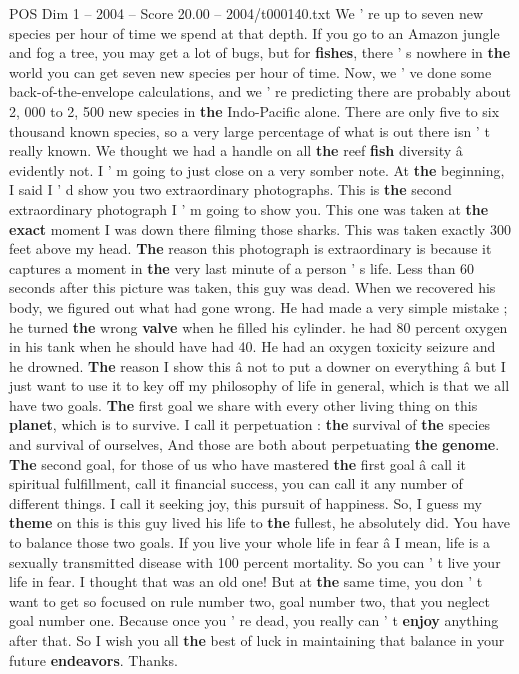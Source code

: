 \begin{textsample}{POS Dim 1 – 2004 – Score 20.00 – 2004/t000140.txt}
We ' re up to seven new species per hour of time we spend at that depth.
If you go to an Amazon jungle and fog a tree, you may get a lot of bugs, but for \textbf{fishes}, there ' s nowhere in \textbf{the} world you can get seven new species per hour of time.
Now, we ' ve done some back-of-the-envelope calculations, and we ' re predicting there are probably about 2, 000 to 2, 500 new species in \textbf{the} Indo-Pacific alone.
There are only five to six thousand known species, so a very large percentage of what is out there isn ' t really known.
We thought we had a handle on all \textbf{the} reef \textbf{fish} diversity â evidently not.
I ' m going to just close on a very somber note.
At \textbf{the} beginning, I said I ' d show you two extraordinary photographs.
This is \textbf{the} second extraordinary photograph I ' m going to show you.
This one was taken at \textbf{the} \textbf{exact} moment I was down there filming those sharks.
This was taken exactly 300 feet above my head. \textbf{The} reason this photograph is extraordinary is because it captures a moment in \textbf{the} very last minute of a person ' s life.
Less than 60 seconds after this picture was taken, this guy was dead.
When we recovered his body, we figured out what had gone wrong.
He had made a very simple mistake ; he turned \textbf{the} wrong \textbf{valve} when he filled his cylinder. he had 80 percent oxygen in his tank when he should have had 40.
He had an oxygen toxicity seizure and he drowned. \textbf{The} reason I show this â not to put a downer on everything â but I just want to use it to key off my philosophy of life in general, which is that we all have two goals. \textbf{The} first goal we share with every other living thing on this \textbf{planet}, which is to survive.
I call it perpetuation : \textbf{the} survival of \textbf{the} species and survival of ourselves, And those are both about perpetuating \textbf{the} \textbf{genome}. \textbf{The} second goal, for those of us who have mastered \textbf{the} first goal â call it spiritual fulfillment, call it financial success, you can call it any number of different things.
I call it seeking joy, this pursuit of happiness.
So, I guess my \textbf{theme} on this is this guy lived his life to \textbf{the} fullest, he absolutely did.
You have to balance those two goals.
If you live your whole life in fear â I mean, life is a sexually transmitted disease with 100 percent mortality.
So you can ' t live your life in fear.
I thought that was an old one!
But at \textbf{the} same time, you don ' t want to get so focused on rule number two, goal number two, that you neglect goal number one.
Because once you ' re dead, you really can ' t \textbf{enjoy} anything after that.
So I wish you all \textbf{the} best of luck in maintaining that balance in your future \textbf{endeavors}.
Thanks.

\end{textsample}
